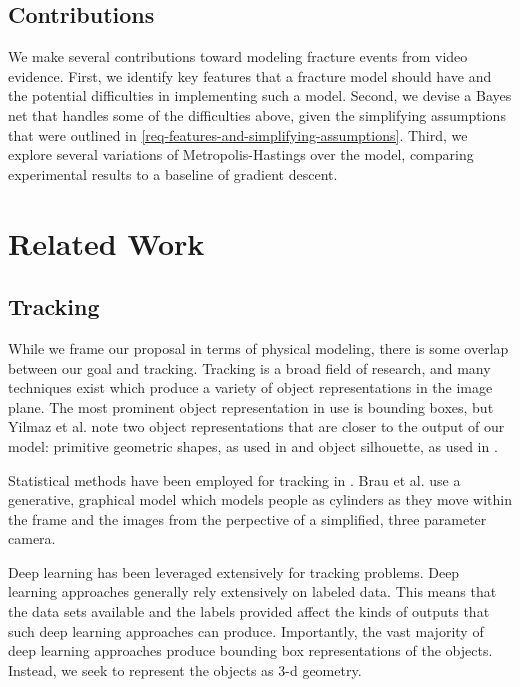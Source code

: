 \documentclass[runningheads]{llncs}
\begin{document}
\subsection{Contributions}

We make several contributions toward modeling fracture events from video 
evidence. First, we identify key features that a fracture model should have and 
the potential difficulties in implementing such a model. 
Second, we devise a Bayes net that handles some of the 
difficulties above, given the simplifying assumptions that were outlined in 
\ref{req-features-and-simplifying-assumptions}. Third, we explore several 
variations of Metropolis-Hastings over the model, comparing experimental results 
to a baseline of gradient descent.

\section{Related Work}
\label{related-work}

\subsection{Tracking}

While we frame our proposal in terms of physical modeling, there is some overlap 
between our goal and tracking. Tracking is a broad field of research, and many 
techniques exist which produce a variety of object representations in the image 
plane. The most prominent object representation in use is bounding boxes, but Yilmaz 
et al.\cite{Yilmaz:2006:OTS:1177352.1177355} note two object representations that are closer to the 
output of our model: primitive geometric shapes, as used in \cite{Comaniciu2003} and object silhouette, 
as used in \cite{YILMAZ2003623}.


Statistical methods have been employed for tracking in \cite{4767755} \cite{BarShalom1990} \cite{317728} \cite{Brau_2013_ICCV}.
Brau et al.\cite{Brau_2013_ICCV} use a generative, graphical model which models people as cylinders 
as they move within the frame and the images from the perpective of a 
simplified, three parameter camera.

Deep learning has been leveraged extensively for tracking problems.\cite{LI2018323} 
Deep learning approaches generally rely extensively on labeled data. This means that the data sets 
available and the labels provided affect the kinds of outputs that such deep 
learning approaches can produce. Importantly, the vast majority of deep learning 
approaches produce bounding box representations of the objects. Instead, we seek 
to represent the objects as 3-d geometry.
\end{document}
